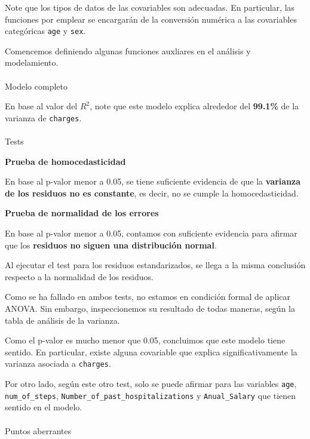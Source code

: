 \documentclass[
]{article}
\makeatletter
\let\oldparagraph\paragraph
\renewcommand{\paragraph}{
    \@ifstar
      \xxxParagraphStar
      \xxxParagraphNoStar
  }
\newcommand{\xxxParagraphStar}[1]{\oldparagraph*{#1}\mbox{}}
\newcommand{\xxxParagraphNoStar}[1]{\oldparagraph{#1}\mbox{}}
\makeatother
\begin{document}
Note que los tipos de datos de las covariables son adecuadas. En
particular, las funciones por emplear se encargarán de la conversión
numérica a las covariables categóricas \texttt{age} y \texttt{sex}.

Comencemos definiendo algunas funciones auxliares en el análisis y
modelamiento.

\paragraph{Modelo completo}\label{modelo-completo}

En base al valor del \(R^2\), note que este modelo explica alrededor del
\textbf{99.1\%} de la varianza de \texttt{charges}.

\paragraph{Tests}\label{tests}

\textbf{Prueba de homocedasticidad}

En base al p-valor menor a 0.05, se tiene suficiente evidencia de que la
\textbf{varianza de los residuos no es constante}, es decir, no se
cumple la homocedasticidad.

\textbf{Prueba de normalidad de los errores}

En base al p-valor menor a 0.05, contamos con suficiente evidencia para
afirmar que los \textbf{residuos no siguen una distribución normal}.

Al ejecutar el test para los residuos estandarizados, se llega a la
misma conclusión respecto a la normalidad de los residuos.

Como se ha fallado en ambos tests, no estamos en condición formal de
aplicar ANOVA. Sin embargo, inspeccionemos su resultado de todas
maneras, según la tabla de análisis de la varianza.

Como el p-valor es mucho menor que 0.05, concluimos que este modelo
tiene sentido. En particular, existe alguna covariable que explica
significativamente la varianza asociada a \texttt{charges}.

Por otro lado, según este otro test, solo se puede afirmar para las
variables \texttt{age}, \texttt{num\_of\_steps},
\texttt{Number\_of\_past\_hospitalizations} y \texttt{Anual\_Salary} que
tienen sentido en el modelo.

\paragraph{Puntos aberrantes}\label{puntos-aberrantes}
\end{document}
